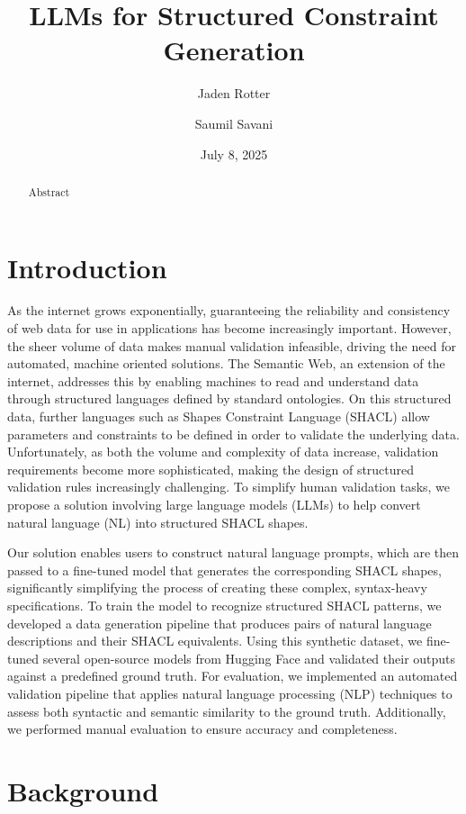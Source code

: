 \documentclass[
  english,        %
  font=times,     %
  twocolumn,      %
]{tumarticle}
\title{LLMs for Structured Constraint Generation}
\author[email=jaden.rotter@tum.de]{Jaden Rotter}
\author[email=saumil.savani@tum.de]{Saumil Savani}
\date{July 8, 2025}
\begin{document}
\maketitle

\begin{abstract}
Abstract
\end{abstract}

\section{Introduction}
As the internet grows exponentially, guaranteeing the reliability and consistency of web data for use in applications has become increasingly important. 
However, the sheer volume of data makes manual validation infeasible, driving the need for automated, machine oriented solutions. 
The Semantic Web, an extension of the internet, addresses this by enabling machines to read and understand data through structured languages defined by standard ontologies. 
On this structured data, further languages such as Shapes Constraint Language (SHACL) allow parameters and constraints to be defined in order to validate the underlying data. 
Unfortunately, as both the volume and complexity of data increase, validation requirements become more sophisticated, making the design of structured validation rules increasingly challenging.
To simplify human validation tasks, we propose a solution involving large language models (LLMs) to help convert natural language (NL) into structured SHACL shapes. 

Our solution enables users to construct natural language prompts, which are then passed to a fine-tuned model that generates the corresponding SHACL shapes, significantly simplifying the process of creating these complex, syntax-heavy specifications. 
To train the model to recognize structured SHACL patterns, we developed a data generation pipeline that produces pairs of natural language descriptions and their SHACL equivalents. 
Using this synthetic dataset, we fine-tuned several open-source models from Hugging Face and validated their outputs against a predefined ground truth.
For evaluation, we implemented an automated validation pipeline that applies natural language processing (NLP) techniques to assess both syntactic and semantic similarity to the ground truth. 
Additionally, we performed manual evaluation to ensure accuracy and completeness.


\section{Background}
\end{document}
